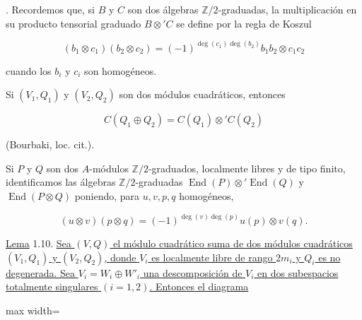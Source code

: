 \pageoriginale

\medskip
{}. Recordemos que, si $B$ y $C$ son dos álgebras
$\mathbb Z/2$-graduadas, la multiplicación en su producto tensorial
graduado $B\otimes' C$ se define por la regla de Koszul

\begin{equation*}
(b_1\otimes c_1)(b_2\otimes c_2)
=(-1)^{\deg(c_1)\deg(b_2)}b_1b_2\otimes c_1c_2
\end{equation*}

cuando los $b_i$ y $c_i$ son homogéneos.

Si $(V_1,Q_1)$ y $(V_2,Q_2)$ son dos módulos cuadráticos, entonces

\begin{equation*}
C(Q_1\oplus Q_2)=C(Q_1)\otimes' C(Q_2)
\end{equation*}

(Bourbaki, loc. cit.).

Si $P$ y $Q$ son dos $A$-módulos $\mathbb Z/2$-graduados, localmente
libres y de tipo finito, identificamos las álgebras
$\mathbb Z/2$-graduadas
$\operatorname{End}(P)\otimes'\operatorname{End}(Q)$ y
$\operatorname{End}(P\otimes Q)$ poniendo, para $u,v,p,q$ homogéneos,

\begin{equation*}
(u\otimes v)(p\otimes q)
=(-1)^{\deg(v)\deg(p)}u(p)\otimes v(q).
\end{equation*}

\medskip
\noindent\underline{Lema} 1.10.\quad
\underline{Sea $(V,Q)$ el módulo cuadrático suma de dos módulos
cuadráticos $(V_1,Q_1)$ y $(V_2,Q_2)$, donde $V_i$ es localmente libre de
rango $2m_i$ y $Q_i$ es no degenerada. Sea
$V_i=W_i\oplus W'_i$ una descomposición de $V_i$ en dos subespacios
totalmente singulares $(i=1,2)$. Entonces el diagrama}

\begin{center}
\small
\begin{adjustbox}{max width=\linewidth}\end{adjustbox}
\end{center}

